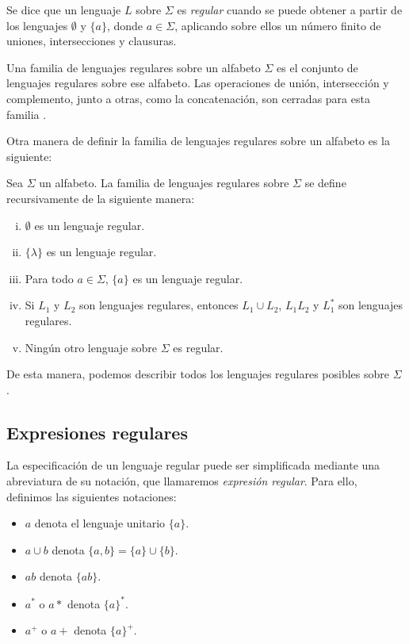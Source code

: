 \begin{definicion} Se dice que un lenguaje $L$ sobre $\Sigma$ es \textit{regular} cuando se puede 
obtener a partir de los lenguajes $\emptyset$ y $\{a\}$, donde $a\in\Sigma$, aplicando sobre ellos un número finito de
uniones, intersecciones y clausuras.
\end{definicion}

Una familia de lenguajes regulares sobre un alfabeto $\Sigma$ es el conjunto de lenguajes regulares sobre ese alfabeto.
Las operaciones de unión, intersección y complemento, junto a otras, como la concatenación, son cerradas para esta 
familia \cite{Mateescu1997}.

\vspace{10pt}
Otra manera de definir la familia de lenguajes regulares sobre un alfabeto es la siguiente:

\begin{definicion}\label{def:familia-regulares}Sea $\Sigma$ un alfabeto. La familia de lenguajes regulares sobre 
$\Sigma$ se define recursivamente de la siguiente manera:
\begin{enumerate}[(i)]
    \item $\emptyset$ es un lenguaje regular.
    \item $\{\lambda\}$ es un lenguaje regular.
    \item Para todo $a\in\Sigma$, $\{a\}$ es un lenguaje regular.
    \item Si $L_1$ y $L_2$ son lenguajes regulares, entonces $L_1\cup L_2$, $L_1L_2$ y $L_1^*$ son lenguajes 
    regulares.
    \item Ningún otro lenguaje sobre $\Sigma$ es regular.
\end{enumerate}
De esta manera, podemos describir todos los lenguajes regulares posibles sobre $\Sigma$ \cite{kelley_2001}.
\end{definicion}

\subsection{Expresiones regulares}

La especificación de un lenguaje regular puede ser simplificada mediante una abreviatura de su notación, que llamaremos
\textit{expresión regular}. Para ello, definimos las siguientes notaciones:

\begin{itemize}
    \item $a$ denota el lenguaje unitario $\{a\}$.
    \item $a\cup b$ denota $\{a,b\}=\{a\}\cup\{b\}$.
    \item $ab$ denota $\{ab\}$.
    \item $a^*$ o $a*$ denota $\{a\}^*$.
    \item $a^+$ o $a+$ denota $\{a\}^+$.
\end{itemize}

